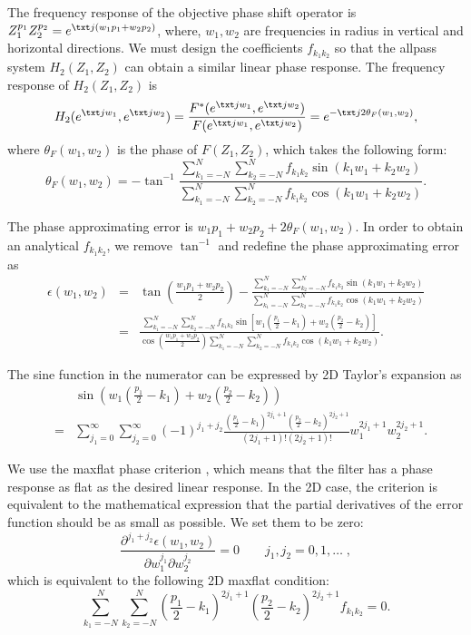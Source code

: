 The frequency response of the objective phase shift operator is
$Z_1^{p_1}Z_2^{p_2}=e^{\txt j(w_1p_1+w_2p_2)}$,
where, $w_1,w_2$ are frequencies in radius 
in vertical and horizontal directions.
We must design the coefficients $f_{k_1k_2}$ so that 
the allpass system $H_2(Z_1,Z_2)$ can obtain a similar linear phase response.
The frequency response of $H_2(Z_1,Z_2)$ is
\begin{equation}
H_2(e^{\txt jw_1},e^{\txt jw_2})
=\frac{
F^*(e^{\txt jw_1},e^{\txt jw_2})
}{
F(e^{\txt jw_1},e^{\txt jw_2})
}=e^{-\txt j2\theta_F(w_1,w_2)},
\end{equation}
where $\theta_F(w_1,w_2)$ is the phase of $F(Z_1,Z_2)$,
which takes the following form:
\begin{equation}
\theta_F(w_1,w_2)=-\tan^{-1}\frac{
\displaystyle{\sum_{k_1=-N}^N\sum_{k_2=-N}^N
f_{k_1k_2}\sin(k_1w_1+k_2w_2)}
}{
\displaystyle{\sum_{k_1=-N}^N\sum_{k_2=-N}^N
f_{k_1k_2}\cos(k_1w_1+k_2w_2)}
}.
\end{equation}

The phase approximating error is $w_1p_1+w_2p_2+2\theta_F(w_1,w_2)$.
In order to obtain an analytical $f_{k_1k_2}$,
we remove $\tan^{-1}$ and redefine the phase approximating error as
\begin{eqnarray}
\epsilon(w_1,w_2) &=&
\tan(\frac{w_1p_1+w_2p_2}{2})
-\frac{
\displaystyle{\sum_{k_1=-N}^N\sum_{k_2=-N}^N
f_{k_1k_2}\sin(k_1w_1+k_2w_2)}
}{
\displaystyle{\sum_{k_1=-N}^N\sum_{k_2=-N}^N
f_{k_1k_2}\cos(k_1w_1+k_2w_2)}
}
\nonumber \\ &=&
\frac{
\displaystyle{\sum_{k_1=-N}^N\sum_{k_2=-N}^N
f_{k_1k_2}\sin[w_1(\frac{p_1}{2}-k_1)+w_2(\frac{p_2}{2}-k_2)]}
}{
\cos(\frac{w_1p_1+w_2p_2}{2})
\displaystyle{\sum_{k_1=-N}^N\sum_{k_2=-N}^N
f_{k_1k_2}\cos(k_1w_1+k_2w_2)}
}.
\end{eqnarray}

The sine function in the numerator can be expressed by
2D Taylor's expansion as 
\begin{eqnarray*}
&&\sin(w_1(\frac{p_1}{2}-k_1)+w_2(\frac{p_2}{2}-k_2))
\\ &=&
\sum_{j_1=0}^\infty\sum_{j_2=0}^\infty
(-1)^{j_1+j_2}\frac{
(\frac{p_1}{2}-k_1)^{2j_1+1}(\frac{p_2}{2}-k_2)^{2j_2+1}
}{(2j_1+1)!(2j_2+1)!}
w_1^{2j_1+1}w_2^{2j_2+1}.
\end{eqnarray*}

We use the maxflat phase criterion 
\cite[]{thiran1971recursive},
which means that the filter has a phase response 
as flat as the desired linear response.
In the 2D case, the criterion 
is equivalent to the mathematical expression that
the partial derivatives of the error function should be as small as possible.
We set them to be zero:
\begin{equation}
\frac{\partial^{j_1+j_2}\epsilon(w_1,w_2)}
{\partial w_1^{j_1}\partial w_2^{j_2}}=0
\qquad j_1,j_2=0,1,\dots\;,
\end{equation}
which is equivalent to the following 2D maxflat condition:
\begin{equation}\label{eq:mf2d}
\sum_{k_1=-N}^N\sum_{k_2=-N}^N
(\frac{p_1}{2}-k_1)^{2j_1+1}(\frac{p_2}{2}-k_2)^{2j_2+1}f_{k_1k_2}=0.
\end{equation}

